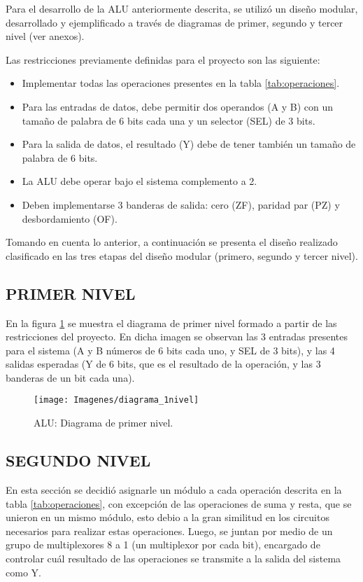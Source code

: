 \documentclass[journal,trans]{IEEEtran}
\begin{document}
Para el desarrollo de la ALU anteriormente descrita, se utilizó un diseño modular, desarrollado y ejemplificado a través de diagramas de primer, segundo y tercer nivel (ver anexos).

Las restricciones previamente definidas para el proyecto son las siguiente:
\begin{itemize}
    \item Implementar todas las operaciones presentes en la tabla \ref{tab:operaciones}.
    \item Para las entradas de datos, debe permitir dos operandos (A y B) con un tamaño de palabra de 6 bits cada una y un selector (SEL) de 3 bits.
    \item Para la salida de datos, el resultado (Y) debe de tener también un tamaño de palabra de 6 bits.
    \item La ALU debe operar bajo el sistema complemento a 2.
    \item Deben implementarse 3 banderas de salida: cero (ZF), paridad par (PZ) y desbordamiento (OF).
\end{itemize}

Tomando en cuenta lo anterior, a continuación se presenta el diseño realizado clasificado en las tres etapas del diseño modular (primero, segundo y tercer nivel).


\subsection{PRIMER NIVEL}
En la figura \ref{fig:diagrama_1nivel} se muestra el diagrama de primer nivel formado a partir de las restricciones del proyecto. En dicha imagen se observan las 3 entradas presentes para el sistema (A y B números de 6 bits cada uno, y SEL de 3 bits), y las 4 salidas esperadas (Y de 6 bits, que es el resultado de la operación, y las 3 banderas de un bit cada una).

\begin{figure}[!h]
	\centering
	\texttt{[image: Imagenes/diagrama\_1nivel]}
	\caption{ALU: Diagrama de primer nivel.}
	\label{fig:diagrama_1nivel}
\end{figure}


\subsection{SEGUNDO NIVEL}
En esta sección se decidió asignarle un módulo a cada operación descrita en la tabla \ref{tab:operaciones}, con excepción de las operaciones de suma y resta, que se unieron en un mismo módulo, esto debio a la gran similitud en los circuitos necesarios para realizar estas operaciones. Luego, se juntan por medio de un grupo de multiplexores 8 a 1 (un multiplexor por cada bit), encargado de controlar cuál resultado de las operaciones se transmite a la salida del sistema como Y.
\end{document}
